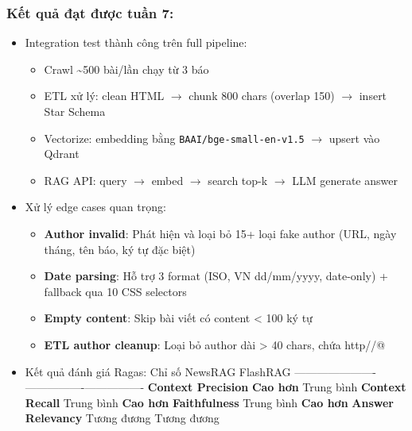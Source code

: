 \hypertarget{kux1ebft-quux1ea3-ux111ux1ea1t-ux111ux1b0ux1ee3c-tuux1ea7n-7}{%
\subsubsection{Kết quả đạt được tuần
7:}}

\begin{itemize}
\item
  Integration test thành công trên full pipeline:

  \begin{itemize}
  \tightlist
  \item
    Crawl \textasciitilde500 bài/lần chạy từ 3 báo
  \item
    ETL xử lý: clean HTML \(\rightarrow\) chunk 800 chars (overlap 150)
    \(\rightarrow\) insert Star Schema
  \item
    Vectorize: embedding bằng \texttt{BAAI/bge-small-en-v1.5}
    \(\rightarrow\) upsert vào Qdrant
  \item
    RAG API: query \(\rightarrow\) embed \(\rightarrow\) search top-k
    \(\rightarrow\) LLM generate answer
  \end{itemize}
\item
  Xử lý edge cases quan trọng:

  \begin{itemize}
  \tightlist
  \item
    \textbf{Author invalid}: Phát hiện và loại bỏ 15+ loại fake author
    (URL, ngày tháng, tên báo, ký tự đặc biệt)
  \item
    \textbf{Date parsing}: Hỗ trợ 3 format (ISO, VN dd/mm/yyyy,
    date-only) + fallback qua 10 CSS selectors
  \item
    \textbf{Empty content}: Skip bài viết có content \textless{} 100 ký
    tự
  \item
    \textbf{ETL author cleanup}: Loại bỏ author dài \textgreater{} 40
    chars, chứa http/\textbar/@
  \end{itemize}
\item
  Kết quả đánh giá Ragas: \textbar{} Chỉ số \textbar{} NewsRAG
  \textbar{} FlashRAG \textbar{}
  \textbar----------------------\textbar----------------\textbar----------------\textbar{}
  \textbar{} \textbf{Context Precision} \textbar{} \textbf{Cao hơn}
  \textbar{} Trung bình \textbar{} \textbar{} \textbf{Context Recall}
  \textbar{} Trung bình \textbar{} \textbf{Cao hơn} \textbar{}
  \textbar{} \textbf{Faithfulness} \textbar{} Trung bình \textbar{}
  \textbf{Cao hơn} \textbar{} \textbar{} \textbf{Answer Relevancy}
  \textbar{} Tương đương \textbar{} Tương đương \textbar{}


\end{itemize}

